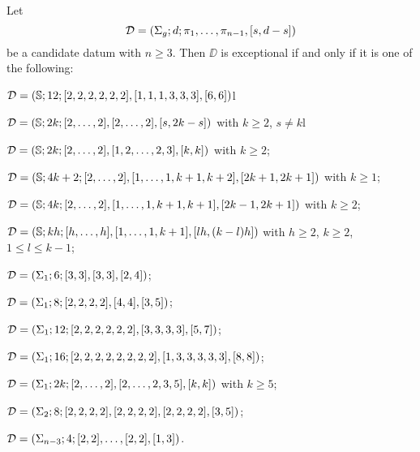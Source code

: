 \begin{solution-hurwitz*}
Let
\[
\mathcal{D}=(\Sigma_{g};d;\pi_1,\ldots,\pi_{n-1},[s,d-s])
\]
be a candidate datum with $n\ge 3$. Then $\DD$ is exceptional if and only if it is one of the following:
\begin{enumarabic}
\item $\mathcal{D}=(\mathbb{S}{};12;[2,2,2,2,2,2],[1,1,1,3,3,3],[6,6])$l
\item $\mathcal{D}=(\mathbb{S}{};2k;[2,\ldots,2],[2,\ldots,2],[s,2k-s])$ with $k\ge 2$, $s\neq k$l
\item $\mathcal{D}=(\mathbb{S}{};2k;[2,\ldots,2],[1,2,\ldots,2,3],[k,k])$ with $k\ge2$;
\item $\mathcal{D}=(\mathbb{S}{};4k+2;[2,\ldots,2],[1,\ldots,1,k+1,k+2],[2k+1,2k+1])$ with $k\ge 1$;
\item $\mathcal{D}=(\mathbb{S}{};4k;[2,\ldots,2],[1,\ldots,1,k+1,k+1],[2k-1,2k+1])$ with $k\ge2$;
\item $\mathcal{D}=(\mathbb{S}{};kh;[h,\ldots,h],[1,\ldots,1,k+1],[lh,(k-l)h])$ with $h\ge 2$, $k\ge 2$, $1\le l\le k-1$;
\item $\mathcal{D}=(\Sigma_{1};6;[3,3],[3,3],[2,4])$;
\item $\mathcal{D}=(\Sigma_{1};8;[2,2,2,2],[4,4],[3,5])$;
\item $\mathcal{D}=(\Sigma_{1};12;[2,2,2,2,2,2],[3,3,3,3],[5,7])$;
\item $\mathcal{D}=(\Sigma_{1};16;[2,2,2,2,2,2,2,2],[1,3,3,3,3,3],[8,8])$;
\item $\mathcal{D}=(\Sigma_{1};2k;[2,\ldots,2],[2,\ldots,2,3,5],[k,k])$ with $k\ge 5$;
\item $\mathcal{D}=(\Sigma_{2};8;[2,2,2,2],[2,2,2,2],[2,2,2,2],[3,5])$;
\item $\mathcal{D}=(\Sigma_{n-3};4;[2,2],\ldots,[2,2],[1,3])$.
\end{enumarabic}
\end{solution-hurwitz*}